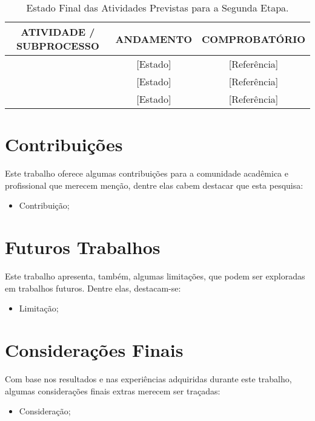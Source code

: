 \begin{table}[h]
	\centering
	{\renewcommand{\arraystretch}{1.5}
	\scriptsize
	\caption[Estado Final das Atividades Segunda Etapa]{Estado Final das Atividades Previstas para a Segunda Etapa.}
	\label{status-segunda-etapa}
	\begin{tabular}{ccc}
		\hline
		\textbf{ATIVIDADE / SUBPROCESSO} & \textbf{ANDAMENTO} & \textbf{COMPROBATÓRIO} \\ \hline
		[Atividade 1] & [Estado] & [Referência] \\ \hline
		[Atividade 2] & [Estado] & [Referência] \\ \hline
		[Atividade 3] & [Estado] & [Referência] \\ \hline
		\end{tabular}
	}
\end{table}

\section{Contribuições}
\label{status-contribuicoes}
Este trabalho oferece algumas contribuições para a comunidade acadêmica e profissional que merecem menção, dentre elas cabem destacar que esta pesquisa:

\begin{itemize}
	\item Contribuição;
\end{itemize}

\section{Futuros Trabalhos}
\label{status-futuros}
Este trabalho apresenta, também, algumas limitações, que podem ser exploradas em trabalhos futuros. Dentre elas, destacam-se:

\begin{itemize}
	\item Limitação;
\end{itemize}

\section{Considerações Finais}
\label{status-consideracoes-finais}
Com base nos resultados e nas experiências adquiridas durante este trabalho, algumas considerações finais extras merecem ser traçadas:

\begin{itemize}
	\item Consideração;
\end{itemize}

